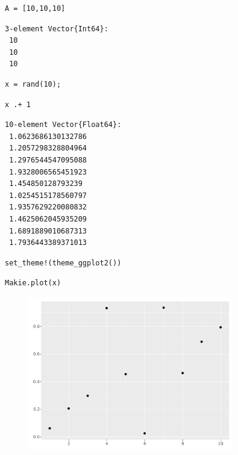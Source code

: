 \begin{lstlisting}[language=JuliaLocal, style=julia]
A = [10,10,10]
\end{lstlisting}

\begin{verbatim}
3-element Vector{Int64}:
 10
 10
 10
\end{verbatim}

\begin{lstlisting}[language=JuliaLocal, style=julia]
x = rand(10);
\end{lstlisting}

\begin{lstlisting}[language=JuliaLocal, style=julia]
x .+ 1
\end{lstlisting}

\begin{verbatim}
10-element Vector{Float64}:
 1.0623686130132786
 1.2057298328804964
 1.2976544547095088
 1.9328006565451923
 1.454850128793239
 1.0254515178560797
 1.9357629220080832
 1.4625062045935209
 1.6891889010687313
 1.7936443389371013
\end{verbatim}

\begin{lstlisting}[language=JuliaLocal, style=julia]
set_theme!(theme_ggplot2())
\end{lstlisting}

\begin{lstlisting}[language=JuliaLocal, style=julia]
Makie.plot(x)
\end{lstlisting}

\begin{figure}[H]
	\centering
	\includegraphics[width=0.8\textwidth]{./figures/notebooktest_figure2.pdf}
	\label{fig:notebooktest_figure2.pdf}

\end{figure}

